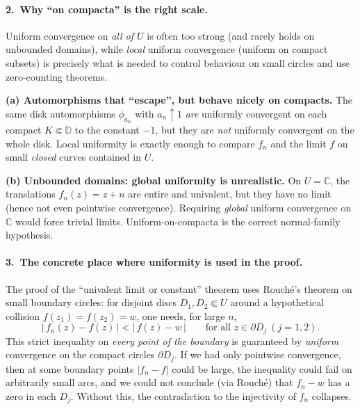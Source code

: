 \documentclass[12pt,a4paper]{article}
\begin{document}
\bigskip

\paragraph{2.\ Why ``on compacta'' is the right scale.}
Uniform convergence on \emph{all of $U$} is often too strong (and rarely holds on unbounded domains),
while \emph{local} uniform convergence (uniform on compact subsets) is precisely what is needed to control behaviour on small circles and use zero-counting theorems.

\medskip

\textbf{(a) Automorphisms that ``escape'', but behave nicely on compacts.}
The same disk automorphisms $\phi_{a_n}$ with $a_n\uparrow 1$ \emph{are} uniformly convergent on each compact $K\Subset\mathbb{D}$ to the constant $-1$,
but they are \emph{not} uniformly convergent on the whole disk.
Local uniformity is exactly enough to compare $f_n$ and the limit $f$ on small \emph{closed} curves contained in $U$.

\medskip

\textbf{(b) Unbounded domains: global uniformity is unrealistic.}
On $U=\mathbb{C}$, the translations $f_n(z)=z+n$ are entire and univalent, but they have no limit (hence not even pointwise convergence).
Requiring \emph{global} uniform convergence on $\mathbb{C}$ would force trivial limits.
Uniform-on-compacta is the correct normal-family hypothesis.

\bigskip

\paragraph{3.\ The concrete place where uniformity is used in the proof.}
The proof of the ``univalent limit or constant'' theorem uses Rouché’s theorem on small boundary circles:
for disjoint discs $D_1,D_2\Subset U$ around a hypothetical collision $f(z_1)=f(z_2)=w$,
one needs, for large $n$,
\[
|\,f_n(z)-f(z)\,|<|\,f(z)-w\,| \qquad \text{for all } z\in \partial D_j \ (j=1,2).
\]
This strict inequality on \emph{every point of the boundary} is guaranteed by \emph{uniform} convergence on the compact circles $\partial D_j$.
If we had only pointwise convergence, then at some boundary points $|f_n-f|$ could be large,
the inequality could fail on arbitrarily small arcs, and we could not conclude (via Rouché) that $f_n-w$
has a zero in each $D_j$.
Without this, the contradiction to the injectivity of $f_n$ collapses.

\bigskip
\end{document}

